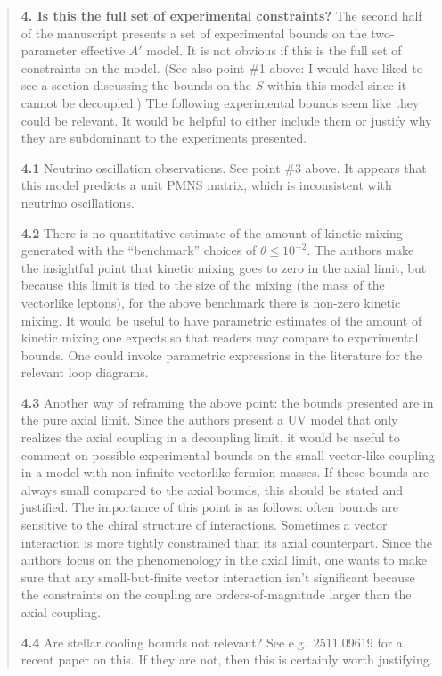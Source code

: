 \documentclass[
]{article}
\begin{document}
\begin{quote}
\textbf{4. Is this the full set of experimental constraints?} The second
half of the manuscript presents a set of experimental bounds on the
two-parameter effective \(A'\) model. It is not obvious if this is the
full set of constraints on the model. (See also point \#1 above: I would
have liked to see a section discussing the bounds on the \(S\) within
this model since it cannot be decoupled.) The following experimental
bounds seem like they could be relevant. It would be helpful to either
include them or justify why they are subdominant to the experiments
presented.

\textbf{4.1} Neutrino oscillation observations. See point \#3 above. It
appears that this model predicts a unit PMNS matrix, which is
inconsistent with neutrino oscillations.

\textbf{4.2} There is no quantitative estimate of the amount of kinetic
mixing generated with the ``benchmark'' choices of
\(\theta\leq10^{-2}\). The authors make the insightful point that
kinetic mixing goes to zero in the axial limit, but because this limit
is tied to the size of the mixing (the mass of the vectorlike leptons),
for the above benchmark there is non-zero kinetic mixing. It would be
useful to have parametric estimates of the amount of kinetic mixing one
expects so that readers may compare to experimental bounds. One could
invoke parametric expressions in the literature for the relevant loop
diagrams.

\textbf{4.3} Another way of reframing the above point: the bounds
presented are in the pure axial limit. Since the authors present a UV
model that only realizes the axial coupling in a decoupling limit, it
would be useful to comment on possible experimental bounds on the small
vector-like coupling in a model with non-infinite vectorlike fermion
masses. If these bounds are always small compared to the axial bounds,
this should be stated and justified. The importance of this point is as
follows: often bounds are sensitive to the chiral structure of
interactions. Sometimes a vector interaction is more tightly constrained
than its axial counterpart. Since the authors focus on the phenomenology
in the axial limit, one wants to make sure that any small-but-finite
vector interaction isn't significant because the constraints on the
coupling are orders-of-magnitude larger than the axial coupling.

\textbf{4.4} Are stellar cooling bounds not relevant? See
e.g.~2511.09619 for a recent paper on this. If they are not, then this
is certainly worth justifying.
\end{quote}
\end{document}
